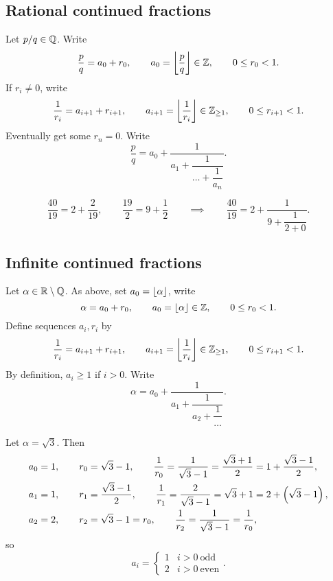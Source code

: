 \subsection{Rational continued fractions}

Let $ p / q \in \mathbb{Q} $. Write
$$ \dfrac{p}{q} = a_0 + r_0, \qquad a_0 = \left\lfloor \dfrac{p}{q} \right\rfloor \in \mathbb{Z}, \qquad 0 \le r_0 < 1. $$
If $ r_i \ne 0 $, write
$$ \dfrac{1}{r_i} = a_{i + 1} + r_{i + 1}, \qquad a_{i + 1} = \left\lfloor \dfrac{1}{r_i} \right\rfloor \in \mathbb{Z}_{\ge 1}, \qquad 0 \le r_{i + 1} < 1. $$
Eventually get some $ r_n = 0 $. Write
$$ \dfrac{p}{q} = a_0 + \dfrac{1}{a_1 + \dfrac{1}{\dots + \dfrac{1}{a_n}}}. $$

\begin{example*}
$$ \dfrac{40}{19} = 2 + \dfrac{2}{19}, \qquad \dfrac{19}{2} = 9 + \dfrac{1}{2} \qquad \implies \qquad \dfrac{40}{19} = 2 + \dfrac{1}{9 + \dfrac{1}{2 + 0}}. $$
\end{example*}

\subsection{Infinite continued fractions}

Let $ \alpha \in \mathbb{R} \setminus \mathbb{Q} $. As above, set $ a_0 = \left\lfloor \alpha \right\rfloor $, write
$$ \alpha = a_0 + r_0, \qquad a_0 = \left\lfloor \alpha \right\rfloor \in \mathbb{Z}, \qquad 0 \le r_0 < 1. $$
Define sequences $ a_i, r_i $ by
$$ \dfrac{1}{r_i} = a_{i + 1} + r_{i + 1}, \qquad a_{i + 1} = \left\lfloor \dfrac{1}{r_i} \right\rfloor \in \mathbb{Z}_{\ge 1}, \qquad 0 \le r_{i + 1} < 1. $$
By definition, $ a_i \ge 1 $ if $ i > 0 $. Write
$$ \alpha = a_0 + \dfrac{1}{a_1 + \dfrac{1}{a_2 + \dfrac{1}{\dots}}}. $$

\begin{example*}
Let $ \alpha = \sqrt{3} $. Then
\begin{align*}
& a_0 = 1, \qquad r_0 = \sqrt{3} - 1, \qquad \dfrac{1}{r_0} = \dfrac{1}{\sqrt{3} - 1} = \dfrac{\sqrt{3} + 1}{2} = 1 + \dfrac{\sqrt{3} - 1}{2}, \\
& a_1 = 1, \qquad r_1 = \dfrac{\sqrt{3} - 1}{2}, \qquad \dfrac{1}{r_1} = \dfrac{2}{\sqrt{3} - 1} = \sqrt{3} + 1 = 2 + \br{\sqrt{3} - 1}, \\
& a_2 = 2, \qquad r_2 = \sqrt{3} - 1 = r_0, \qquad \dfrac{1}{r_2} = \dfrac{1}{\sqrt{3} - 1} = \dfrac{1}{r_0},
\end{align*}
so
$$ a_i =
\begin{cases}
1 & i > 0 \ \text{odd} \\
2 & i > 0 \ \text{even}
\end{cases}.
$$
\end{example*}

